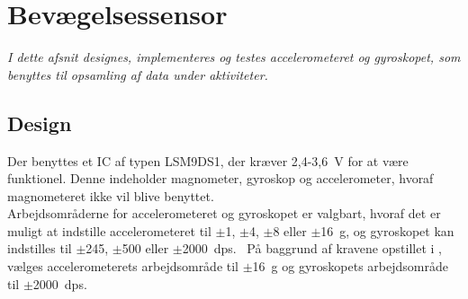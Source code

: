 \section{Bevægelsessensor}\label{sec_design_LSM9DS1}
\textit{I dette afsnit designes, implementeres og testes accelerometeret og gyroskopet, som benyttes til opsamling af data under aktiviteter.}

\subsection{Design} \label{design_lsm}
Der benyttes et IC af typen LSM9DS1, der kræver 2,4-3,6~V for at være funktionel. Denne indeholder magnometer, gyroskop og accelerometer, hvoraf magnometeret ikke vil blive benyttet.~\citep{Jimb02016,STMicroelectronics2016} \\ 
Arbejdsområderne for accelerometeret og gyroskopet er valgbart, hvoraf det er muligt at indstille accelerometeret til $\pm$1, $\pm$4, $\pm$8 eller $\pm$16~g, og gyroskopet kan indstilles til $\pm$245, $\pm$500 eller $\pm$2000~dps.~\citep{Jimb02016,STMicroelectronics2016} På baggrund af kravene opstillet i , vælges accelerometerets arbejdsområde til $\pm$16~g og gyroskopets arbejdsområde til $\pm$2000~dps. 

